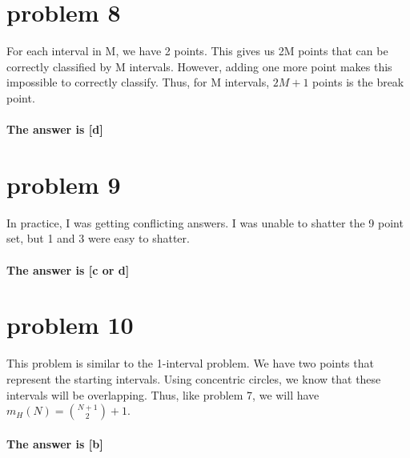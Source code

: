 \documentclass{article}
\begin{document}
\section*{problem 8} 
For each interval in M, we have 2 points. This gives us 2M points that can be correctly classified by M intervals. However, adding one more point makes this impossible to correctly classify. Thus, for M intervals, $2M + 1$ points is the break point.\\ \\
\textbf{The answer is [d]}

\section*{problem 9}
In practice, I was getting conflicting answers. I was unable to shatter the 9 point set, but 1 and 3 were easy to shatter.\\\\
\textbf{The answer is [c or d]}

\section*{problem 10}
This problem is similar to the 1-interval problem. We have two points that represent the starting intervals. Using concentric circles, we know that these intervals will be overlapping. Thus, like problem 7, we will have $m_H(N) = {N+1 \choose 2} + 1$.\\\\
\textbf{The answer is [b]}
\end{document}
